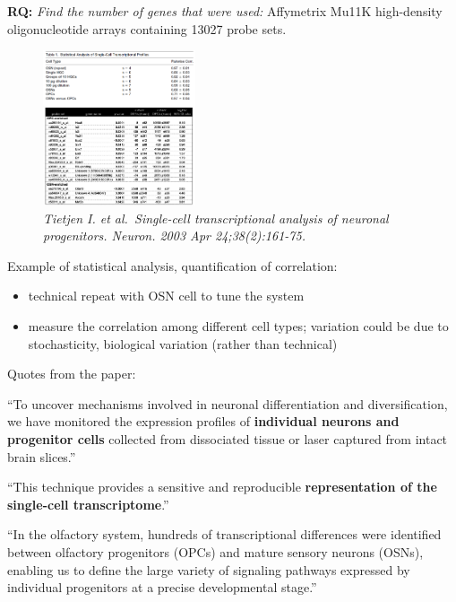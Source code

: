 \begin{tcolorbox}
[width=\linewidth, sharp corners=all, colback=white!95!black]

\textbf{RQ: }\emph{Find the number of genes that were used:} 
Affymetrix Mu11K high-density oligonucleotide arrays containing 13027 probe sets.
\end{tcolorbox}

\begin{figure}
\centering
\includegraphics[width=0.4\textwidth]{images/Screenshot_2023-03-15_at_11-30-24.png}
\caption{\emph{Tietjen I. et al.~Single-cell transcriptional analysis of
neuronal progenitors. Neuron. 2003 Apr 24;38(2):161-75.}}
\end{figure}

Example of statistical analysis, quantification of correlation:

\begin{itemize}
\tightlist
\item
  technical repeat with OSN cell to tune the system
\item
  measure the correlation among different cell types; variation could be
  due to stochasticity, biological variation (rather than technical)
\end{itemize}

Quotes from the paper:

``To uncover mechanisms involved in neuronal differentiation and
diversification, we have monitored the expression profiles of
\textbf{individual neurons and progenitor cells} collected from
dissociated tissue or laser captured from intact brain slices.''

``This technique provides a sensitive and reproducible
\textbf{representation of the single-cell transcriptome}.''

``In the olfactory system, hundreds of transcriptional differences were
identified between olfactory progenitors (OPCs) and mature sensory
neurons (OSNs), enabling us to define the large variety of signaling
pathways expressed by individual progenitors at a precise developmental
stage.''

